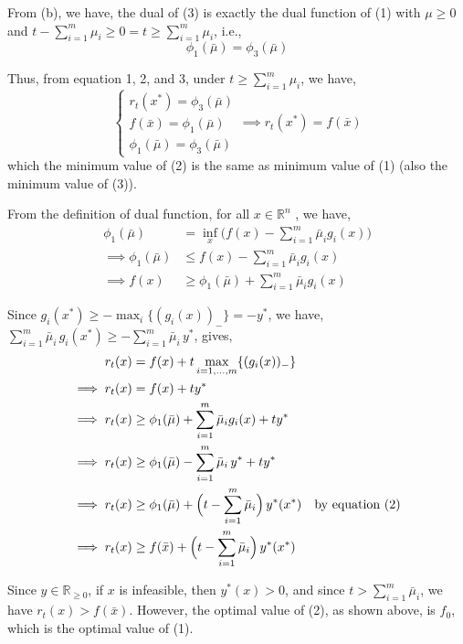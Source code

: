 \documentclass[12pt]{article}
\begin{document}
From (b), we have, the dual of (3) is exactly the dual function of (1) with $\mu \geq 0$ and $t-\sum_{i=1}^m \mu_i \ge 0 = t \ge \sum_{i=1}^m \mu_i$, i.e., 
\begin{equation}\tag{3}
\phi_1(\bar \mu) = \phi_3(\bar \mu)
\end{equation}

Thus, from equation 1, 2, and 3, under $t \ge \sum_{i=1}^m \mu_i$, we have, 
$$\begin{cases}
	r_t(x^*) = \phi_3(\bar \mu)\\
	f(\bar x) = \phi_1(\bar\mu) \\
	\phi_1(\bar \mu) = \phi_3(\bar \mu)
\end{cases} \implies r_t(x^*) = f(\bar x)$$
which the minimum value of (2) is the same as minimum value of (1) (also the minimum value of (3)).

From the definition of dual function, for all $x\in \mathbb{R}^n$ , we have, 
\begin{align*}
	\phi_1(\bar \mu) &=\inf_{x}\bigl(f(x)-\sum_{i=1}^m \bar\mu_i g_i(x)\bigr)\\
	 \implies  \phi_1(\bar \mu) &\le f(x)-\sum_{i=1}^m \bar\mu_i g_i(x) \\
	 \implies  f(x) &\ge\phi_1(\bar\mu)+\sum_{i=1}^m \bar\mu_i g_i(x)
\end{align*}

Since $g_i(x^*)\ge -\max_{i}\{(g_i(x))_-\} = -y^*$, we have, 
$
\sum_{i=1}^m \bar\mu_i\,g_i(x^*)
\ge-\sum_{i=1}^m \bar\mu_i\,y^*
$, gives, 
\begin{align*}
	r_t(x)&= f(x)+t\max_{i=1,\dots,m}\{(g_i(x))_-\} \\
	\implies r_t(x)&= f(x)+ty^* \\
	\implies r_t(x)&\ge \phi_1(\bar\mu)+\sum_{i=1}^m \bar\mu_i g_i(x)+ty^*  \\
	\implies r_t(x)&\ge \phi_1(\bar\mu)-\sum_{i=1}^m \bar\mu_i\,y^*+ty^*  \\
	\implies r_t(x)&\ge \phi_1(\bar\mu)+\Bigl(t-\sum_{i=1}^m \bar\mu_i\Bigr)\,y^*(x^*) \quad \text{by equation (2)} \\
	\implies r_t(x)&\ge f(\bar x)+\Bigl(t-\sum_{i=1}^m \bar\mu_i\Bigr)\,y^*(x^*)
\end{align*}

Since $y \in \mathbb{R}_{\ge 0}$, if $x$ is infeasible, then $y^*(x)>0$, and since $t>\sum_{i=1}^m\bar\mu_i$, we have $r_t(x)>f(\bar x)$. However, the optimal value of (2), as shown above, is $f_0$, which is the optimal value of (1).
\end{document}

